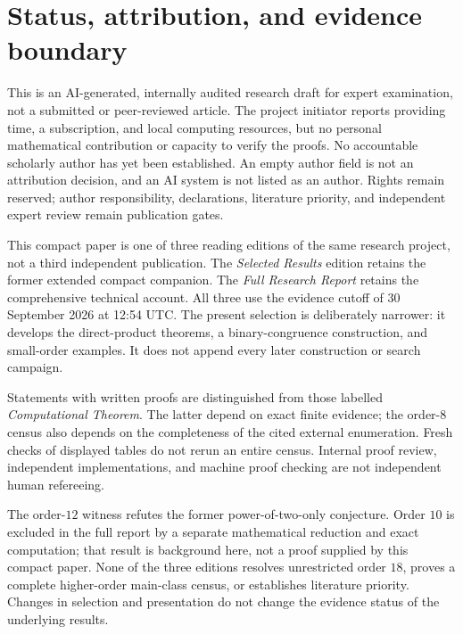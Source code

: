 \section*{Status, attribution, and evidence boundary}
This is an AI-generated, internally audited research draft for expert
examination, not a submitted or peer-reviewed article. The project initiator
reports providing time, a subscription, and local computing resources, but
no personal mathematical contribution or capacity to verify the proofs.
No accountable scholarly author has yet been established. An empty author
field is not an attribution decision, and an AI system is not listed as an
author. Rights remain reserved; author responsibility, declarations,
literature priority, and independent expert review remain publication gates.

This compact paper is one of three reading editions of the same research
project, not a third independent publication. The \emph{Selected Results}
edition retains the former extended compact companion. The \emph{Full
Research Report} retains the comprehensive technical account. All three
use the evidence cutoff of 30 September 2026 at 12:54 UTC. The present
selection is deliberately narrower: it develops the direct-product
theorems, a binary-congruence construction, and small-order examples.
It does not append every later construction or search campaign.

Statements with written proofs are distinguished from those labelled
\emph{Computational Theorem}. The latter depend on exact finite evidence;
the order-$8$ census also depends on the completeness of the cited external
enumeration. Fresh checks of displayed tables do not rerun an entire census.
Internal proof review, independent implementations, and machine proof
checking are not independent human refereeing.

The order-$12$ witness refutes the former power-of-two-only conjecture.
Order $10$ is excluded in the full report by a separate mathematical
reduction and exact computation; that result is background here, not a
proof supplied by this compact paper. None of the three editions resolves
unrestricted order $18$, proves a complete higher-order main-class census,
or establishes literature priority. Changes in selection and presentation
do not change the evidence status of the underlying results.
